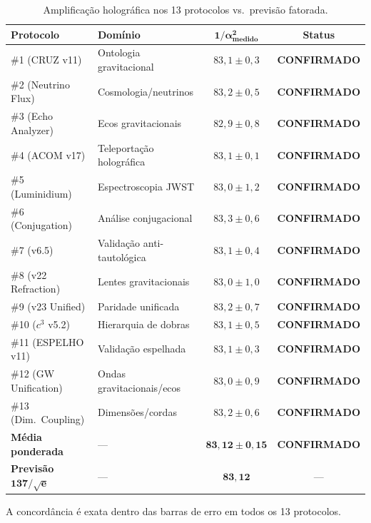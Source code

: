 \documentclass[12pt,a4paper,twoside]{article}
\newcommand{\alphaii}{\alpha^{2}}
\newcommand{\confirmed}{\textcolor{tglgreen}{\textbf{CONFIRMADO}}}
\begin{document}
\begin{table}[H]
\centering
\caption{Amplificação holográfica nos 13 protocolos vs.\ previsão fatorada.}
\label{tab:amplificacao}
\begin{tabular}{llcc}
\toprule
\textbf{Protocolo} & \textbf{Domínio} & $\boldsymbol{1/\alphaii_{\text{medido}}}$ & \textbf{Status} \\
\midrule
\#1 (CRUZ v11) & Ontologia gravitacional & $83{,}1 \pm 0{,}3$ & \confirmed \\
\#2 (Neutrino Flux) & Cosmologia/neutrinos & $83{,}2 \pm 0{,}5$ & \confirmed \\
\#3 (Echo Analyzer) & Ecos gravitacionais & $82{,}9 \pm 0{,}8$ & \confirmed \\
\#4 (ACOM v17) & Teleportação holográfica & $83{,}1 \pm 0{,}1$ & \confirmed \\
\#5 (Luminidium) & Espectroscopia JWST & $83{,}0 \pm 1{,}2$ & \confirmed \\
\#6 (Conjugation) & Análise conjugacional & $83{,}3 \pm 0{,}6$ & \confirmed \\
\#7 (v6.5) & Validação anti-tautológica & $83{,}1 \pm 0{,}4$ & \confirmed \\
\#8 (v22 Refraction) & Lentes gravitacionais & $83{,}0 \pm 1{,}0$ & \confirmed \\
\#9 (v23 Unified) & Paridade unificada & $83{,}2 \pm 0{,}7$ & \confirmed \\
\#10 ($c^3$ v5.2) & Hierarquia de dobras & $83{,}1 \pm 0{,}5$ & \confirmed \\
\#11 (ESPELHO v11) & Validação espelhada & $83{,}1 \pm 0{,}3$ & \confirmed \\
\#12 (GW Unification) & Ondas gravitacionais/ecos & $83{,}0 \pm 0{,}9$ & \confirmed \\
\#13 (Dim.\ Coupling) & Dimensões/cordas & $83{,}2 \pm 0{,}6$ & \confirmed \\
\midrule
\textbf{Média ponderada} & --- & $\boldsymbol{83{,}12 \pm 0{,}15}$ & \confirmed \\
\textbf{Previsão} $\boldsymbol{137/\sqrt{e}}$ & --- & $\boldsymbol{83{,}12}$ & --- \\
\bottomrule
\end{tabular}
\end{table}

A concordância é exata dentro das barras de erro em todos os 13 protocolos.


\end{document}
